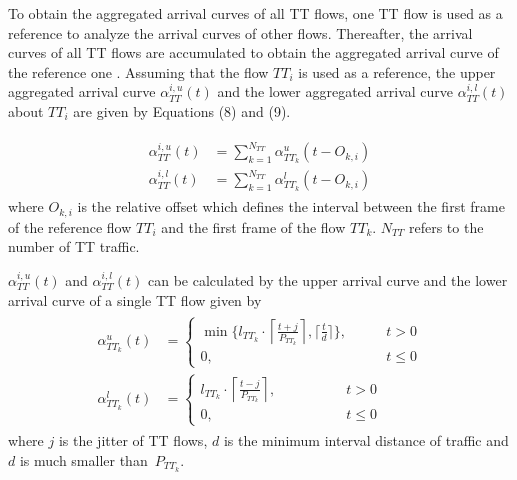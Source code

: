 \documentclass[electronics,article,accept,moreauthors,pdftex]{Definitions/mdpi}
\begin{document}
To obtain the aggregated arrival curves of all TT flows, one TT flow is used as a reference to analyze the arrival curves of other flows. Thereafter, the arrival curves of all TT flows are accumulated to obtain the aggregated arrival curve of the reference one \cite{moy2010arrival}. Assuming that the flow $TT_i$ is used as a reference, the upper aggregated arrival curve $\alpha^{i,u}_{TT}(t)$ and the lower aggregated arrival curve $\alpha^{i,l}_{TT}(t)$ about $TT_i$ are given by Equations (8) and (9).

\begin{gather}
\begin{align}
	\alpha^{i,u}_{TT}(t) &= \sum_{k=1}^{N_{TT}} \alpha_{TT_k}^u(t-O_{k,i})\\
	\alpha^{i,l}_{TT}(t) &= \sum_{k=1}^{N_{TT}} \alpha_{TT_k}^l(t-O_{k,i})
\end{align}
\end{gather}
where $O_{k,i}$ is the relative offset which defines the interval between the first frame of the reference flow $TT_i$ and the first frame of the flow $TT_k$. $N_{TT}$ refers to the number of TT traffic.

$\alpha^{i,u}_{TT}(t)$ and $\alpha^{i,l}_{TT}(t)$ can be calculated by the upper arrival curve and the lower arrival curve of a single TT flow given by
\begin{gather}
\begin{align}
	\alpha_{TT_k}^u(t)&=\begin{cases}
 	\min \{ {l_{TT_k}\cdot \left \lceil \frac{t+j}{P_{TT_k}} \right \rceil} , \lceil \frac{t}{d} \rceil \},
	\qquad & t>0 \\
	0, \qquad & t\le0
\end{cases}\\
	\alpha_{TT_k}^l(t)&=\begin{cases}
	l_{TT_k}\cdot \left \lceil \frac{t-j}{P_{TT_k}} \right \rceil,
	\qquad ~~~~~~~~~~& t>0 \\
	0, \qquad ~~~~~~~& t\le0
\end{cases}
\end{align}
\end{gather}
where $j$ is the jitter of TT flows, $d$ is the minimum interval distance of traffic and $d$ is much smaller than~$P_{TT_{k}}$.
\end{document}
